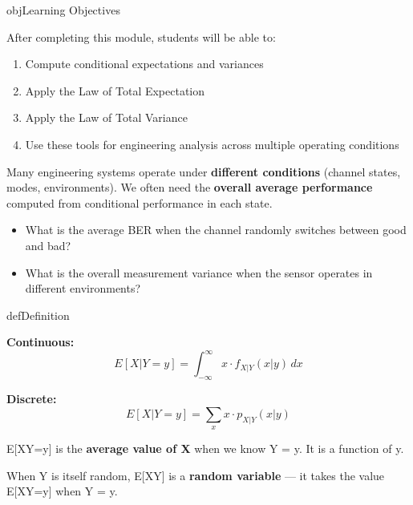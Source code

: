 \begin{PSbox}[unbreakable]{obj}{Learning Objectives}

After completing this module, students will be able to:

\begin{enumerate}
\def\labelenumi{\arabic{enumi}.}
\tightlist
\item
  Compute conditional expectations and variances
\item
  Apply the Law of Total Expectation
\item
  Apply the Law of Total Variance
\item
  Use these tools for engineering analysis across multiple operating conditions
\end{enumerate}

\end{PSbox}


Many engineering systems operate under \textbf{different conditions} (channel states, modes, environments). We often need the \textbf{overall average performance} computed from conditional performance in each state.

\begin{itemize}
\tightlist
\item
  What is the average BER when the channel randomly switches between good and bad?
\item
  What is the overall measurement variance when the sensor operates in different environments?
\end{itemize}


\begin{PSbox}[unbreakable]{def}{Definition}

\textbf{Continuous:}\PSbr{}\[E[X|Y=y] = \int_{-\infty}^{\infty} x \cdot f_{X|Y}(x|y) \, dx\]

\textbf{Discrete:}\PSbr{}\[E[X|Y=y] = \sum_x x \cdot p_{X|Y}(x|y)\]

\end{PSbox}


E[X\textbar{}Y=y] is the \textbf{average value of X} when we know Y = y. It is a function of y.


When Y is itself random, E[X\textbar{}Y] is a \textbf{random variable} — it takes the value E[X\textbar{}Y=y] when Y = y.

